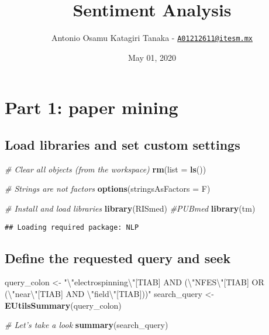 \documentclass[
  a4paper]{article}
\title{Sentiment Analysis}
\author{Antonio Osamu Katagiri Tanaka -
\href{mailto:A01212611@itesm.mx}{\nolinkurl{A01212611@itesm.mx}}}
\date{May 01, 2020}
\newenvironment{Shaded}{\begin{snugshade}}{\end{snugshade}}
\newcommand{\CharTok}[1]{\textcolor[rgb]{0.31,0.60,0.02}{#1}}
\newcommand{\CommentTok}[1]{\textcolor[rgb]{0.56,0.35,0.01}{\textit{#1}}}
\newcommand{\DataTypeTok}[1]{\textcolor[rgb]{0.13,0.29,0.53}{#1}}
\newcommand{\KeywordTok}[1]{\textcolor[rgb]{0.13,0.29,0.53}{\textbf{#1}}}
\newcommand{\NormalTok}[1]{#1}
\newcommand{\StringTok}[1]{\textcolor[rgb]{0.31,0.60,0.02}{#1}}
\begin{document}
\maketitle

\hypertarget{part-1-paper-mining}{%
\section{Part 1: paper mining}\label{part-1-paper-mining}}

\hypertarget{load-libraries-and-set-custom-settings}{%
\subsection{Load libraries and set custom
settings}\label{load-libraries-and-set-custom-settings}}

\begin{Shaded}
\begin{Highlighting}[]
\CommentTok{# Clear all objects (from the workspace)}
\KeywordTok{rm}\NormalTok{(}\DataTypeTok{list =} \KeywordTok{ls}\NormalTok{())}

\CommentTok{# Strings are not factors}
\KeywordTok{options}\NormalTok{(}\DataTypeTok{stringsAsFactors =}\NormalTok{ F)}

\CommentTok{# Install and load libraries}
\KeywordTok{library}\NormalTok{(RISmed) }\CommentTok{#PUBmed}
\KeywordTok{library}\NormalTok{(tm)}
\end{Highlighting}
\end{Shaded}

\begin{verbatim}
## Loading required package: NLP
\end{verbatim}

\hypertarget{define-the-requested-query-and-seek}{%
\subsection{Define the requested query and
seek}\label{define-the-requested-query-and-seek}}

\begin{Shaded}
\begin{Highlighting}[]
\NormalTok{query_colon <-}
\StringTok{    "}\CharTok{\textbackslash{}"}\StringTok{electrospinning}\CharTok{\textbackslash{}"}\StringTok{[TIAB] AND (}\CharTok{\textbackslash{}"}\StringTok{NFES}\CharTok{\textbackslash{}"}\StringTok{[TIAB] OR (}\CharTok{\textbackslash{}"}\StringTok{near}\CharTok{\textbackslash{}"}\StringTok{[TIAB] AND }\CharTok{\textbackslash{}"}\StringTok{field}\CharTok{\textbackslash{}"}\StringTok{[TIAB]))"}
\NormalTok{search_query <-}\StringTok{ }\KeywordTok{EUtilsSummary}\NormalTok{(query_colon)}

\CommentTok{# Let's take a look}
\KeywordTok{summary}\NormalTok{(search_query)}
\end{Highlighting}
\end{Shaded}
\end{document}
